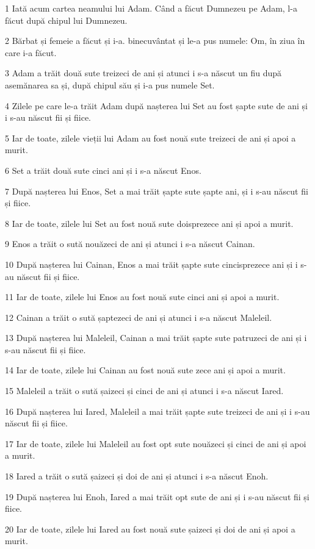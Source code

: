 \par 1 Iată acum cartea neamului lui Adam. Când a făcut Dumnezeu pe Adam, l-a făcut după chipul lui Dumnezeu.
\par 2 Bărbat și femeie a făcut și i-a. binecuvântat și le-a pus numele: Om, în ziua în care i-a făcut.
\par 3 Adam a trăit două sute treizeci de ani și atunci i s-a născut un fiu după asemănarea sa și, după chipul său și i-a pus numele Set.
\par 4 Zilele pe care le-a trăit Adam după nașterea lui Set au fost șapte sute de ani și i s-au născut fii și fiice.
\par 5 Iar de toate, zilele vieții lui Adam au fost nouă sute treizeci de ani și apoi a murit.
\par 6 Set a trăit două sute cinci ani și i s-a născut Enos.
\par 7 După nașterea lui Enos, Set a mai trăit șapte sute șapte ani, și i s-au născut fii și fiice.
\par 8 Iar de toate, zilele lui Set au fost nouă sute doisprezece ani și apoi a murit.
\par 9 Enos a trăit o sută nouăzeci de ani și atunci i s-a născut Cainan.
\par 10 După nașterea lui Cainan, Enos a mai trăit șapte sute cincisprezece ani și i s-au născut fii și fiice.
\par 11 Iar de toate, zilele lui Enos au fost nouă sute cinci ani și apoi a murit.
\par 12 Cainan a trăit o sută șaptezeci de ani și atunci i s-a născut Maleleil.
\par 13 După nașterea lui Maleleil, Cainan a mai trăit șapte sute patruzeci de ani și i s-au născut fii și fiice.
\par 14 Iar de toate, zilele lui Cainan au fost nouă sute zece ani și apoi a murit.
\par 15 Maleleil a trăit o sută șaizeci și cinci de ani și atunci i s-a născut Iared.
\par 16 După nașterea lui Iared, Maleleil a mai trăit șapte sute treizeci de ani și i s-au născut fii și fiice.
\par 17 Iar de toate, zilele lui Maleleil au fost opt sute nouăzeci și cinci de ani și apoi a murit.
\par 18 Iared a trăit o sută șaizeci și doi de ani și atunci i s-a născut Enoh.
\par 19 După nașterea lui Enoh, Iared a mai trăit opt sute de ani și i s-au născut fii și fiice.
\par 20 Iar de toate, zilele lui Iared au fost nouă sute șaizeci și doi de ani și apoi a murit.
